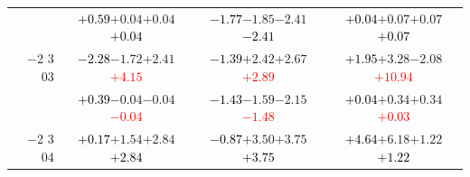 \documentclass[compress]{beamer}
\begin{document}
\begin{frame}
\begin{tabular}{r | c | c | c}
          & \textcolor{black}{$+0.59$}\hspace{0.1 cm}$+0.04$\hspace{0.1 cm}$+0.04$\hspace{0.1 cm}\textcolor{black}{$+0.04$} & \textcolor{black}{$-1.77$}\hspace{0.1 cm}$-1.85$\hspace{0.1 cm}$-2.41$\hspace{0.1 cm}\textcolor{black}{$-2.41$} & \textcolor{black}{$+0.04$}\hspace{0.1 cm}$+0.07$\hspace{0.1 cm}$+0.07$\hspace{0.1 cm}\textcolor{black}{$+0.07$} \\
$-$2 3 03 & \textcolor{black}{$-2.28$}\hspace{0.1 cm}$-1.72$\hspace{0.1 cm}$+2.41$\hspace{0.1 cm}\textcolor{red}{$+4.15$} & \textcolor{black}{$-1.39$}\hspace{0.1 cm}$+2.42$\hspace{0.1 cm}$+2.67$\hspace{0.1 cm}\textcolor{red}{$+2.89$} & \textcolor{black}{$+1.95$}\hspace{0.1 cm}$+3.28$\hspace{0.1 cm}$-2.08$\hspace{0.1 cm}\textcolor{red}{$+10.94$} \\
          & \textcolor{black}{$+0.39$}\hspace{0.1 cm}$-0.04$\hspace{0.1 cm}$-0.04$\hspace{0.1 cm}\textcolor{red}{$-0.04$} & \textcolor{black}{$-1.43$}\hspace{0.1 cm}$-1.59$\hspace{0.1 cm}$-2.15$\hspace{0.1 cm}\textcolor{red}{$-1.48$} & \textcolor{black}{$+0.04$}\hspace{0.1 cm}$+0.34$\hspace{0.1 cm}$+0.34$\hspace{0.1 cm}\textcolor{red}{$+0.03$} \\
$-$2 3 04 & \textcolor{black}{$+0.17$}\hspace{0.1 cm}$+1.54$\hspace{0.1 cm}$+2.84$\hspace{0.1 cm}\textcolor{black}{$+2.84$} & \textcolor{black}{$-0.87$}\hspace{0.1 cm}$+3.50$\hspace{0.1 cm}$+3.75$\hspace{0.1 cm}\textcolor{black}{$+3.75$} & \textcolor{black}{$+4.64$}\hspace{0.1 cm}$+6.18$\hspace{0.1 cm}$+1.22$\hspace{0.1 cm}\textcolor{black}{$+1.22$} \\

\end{tabular}
\end{frame}
\end{document}
